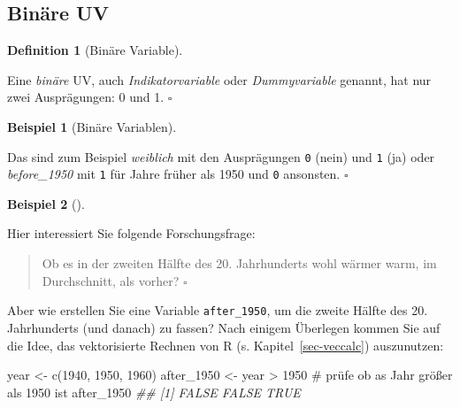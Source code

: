 \documentclass[
  letterpaper,
]{scrbook}
\newenvironment{Shaded}{\begin{snugshade}}{\end{snugshade}}
\newcommand{\CommentTok}[1]{\textcolor[rgb]{0.37,0.37,0.37}{#1}}
\newcommand{\DecValTok}[1]{\textcolor[rgb]{0.68,0.00,0.00}{#1}}
\newcommand{\DocumentationTok}[1]{\textcolor[rgb]{0.37,0.37,0.37}{\textit{#1}}}
\newcommand{\FunctionTok}[1]{\textcolor[rgb]{0.28,0.35,0.67}{#1}}
\newcommand{\NormalTok}[1]{\textcolor[rgb]{0.00,0.23,0.31}{#1}}
\newcommand{\OtherTok}[1]{\textcolor[rgb]{0.00,0.23,0.31}{#1}}
\newcommand{\SpecialCharTok}[1]{\textcolor[rgb]{0.37,0.37,0.37}{#1}}
\theoremstyle{definition}
\theoremstyle{definition}
\newtheorem{example}{Beispiel}[chapter]
\theoremstyle{definition}
\newtheorem{definition}{Definition}[chapter]
\theoremstyle{remark}
\begin{document}
\subsection{Binäre UV}\label{binuxe4re-uv}

\begin{definition}[Binäre
Variable]\protect\hypertarget{def-binvar}{}\label{def-binvar}

Eine \emph{binäre} UV, auch \emph{Indikatorvariable} oder
\emph{Dummyvariable} genannt, hat nur zwei Ausprägungen: 0 und 1.
\(\square\)

\end{definition}

\begin{example}[Binäre
Variablen]\protect\hypertarget{exm-bin}{}\label{exm-bin}

Das sind zum Beispiel \emph{weiblich} mit den Ausprägungen \texttt{0}
(nein) und \texttt{1} (ja) oder \emph{before\_1950} mit \texttt{1} für
Jahre früher als 1950 und \texttt{0} ansonsten. \(\square\)

\end{example}

\begin{example}[]\protect\hypertarget{exm-binuv}{}\label{exm-binuv}

Hier interessiert Sie folgende Forschungsfrage:

\begin{quote}
{} Ob es in der zweiten Hälfte des 20. Jahrhunderts wohl
wärmer warm, im Durchschnitt, als vorher? \(\square\)
\end{quote}

\end{example}

Aber wie erstellen Sie eine Variable \texttt{after\_1950}, um die zweite
Hälfte des 20. Jahrhunderts (und danach) zu fassen? Nach einigem
Überlegen kommen Sie auf die Idee, das vektorisierte Rechnen von R (s.
Kapitel~\ref{sec-veccalc}) auszunutzen:

\begin{Shaded}
\begin{Highlighting}[]
\NormalTok{year }\OtherTok{\textless{}{-}} \FunctionTok{c}\NormalTok{(}\DecValTok{1940}\NormalTok{, }\DecValTok{1950}\NormalTok{, }\DecValTok{1960}\NormalTok{)}
\NormalTok{after\_1950 }\OtherTok{\textless{}{-}}\NormalTok{ year }\SpecialCharTok{\textgreater{}} \DecValTok{1950}  \CommentTok{\# prüfe ob as Jahr größer als 1950 ist}
\NormalTok{after\_1950}
\DocumentationTok{\#\# [1] FALSE FALSE  TRUE}
\end{Highlighting}
\end{Shaded}
\end{document}
